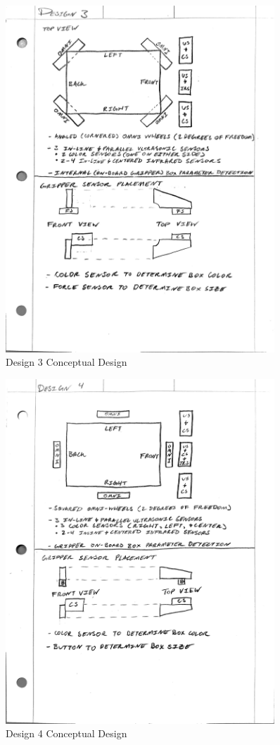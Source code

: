 \documentclass[12pt]{report}
\begin{document}
\begin{figure}[H]
    \centering
    \includegraphics[width=0.9\textwidth]{Images/Designs/Design3.pdf}
    \caption{Design 3 Conceptual Design}
    \label{fig:design3}
\end{figure}

\begin{figure}[H]
    \centering
    \includegraphics[width=0.9\textwidth]{Images/Designs/Design4.pdf}
    \caption{Design 4 Conceptual Design}
    \label{fig:design4}
\end{figure}
\end{document}
